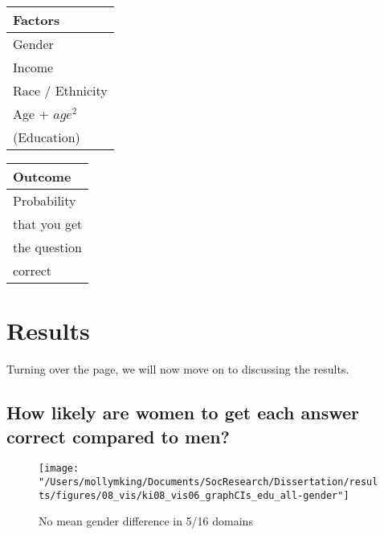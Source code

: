 \documentclass[]{article}
\begin{document}
\begin{table}[ht]
\centering
    \begin{tabular}{l}  %
      \hline   %
      Factors          \\
      \hline   %
      Gender           \\
      Income           \\
      Race / Ethnicity \\
      Age + $age^2$    \\
      (Education)        \\
      \hline  %
    \end{tabular}
    \begin{tabular}{l}  %
       \hline   %
       Outcome        \\
       \hline   %
       Probability      \\
       that you get     \\
       the question     \\
       correct          \\
       \hline  %
     \end{tabular}
\end{table}



\newpage
\section{Results}\label{Results}

Turning over the page, we will now move on to discussing the results.

\subsection{How likely are women to get each answer correct compared to men?}
\begin{figure}[ht]
    \begin{center}
      \texttt{[image: "/Users/mollymking/Documents/SocResearch/Dissertation/results/figures/08\_vis/ki08\_vis06\_graphCIs\_edu\_all-gender"]}
      \caption{No mean gender difference in 5/16 domains}
    \end{center}
\end{figure}
\end{document}
